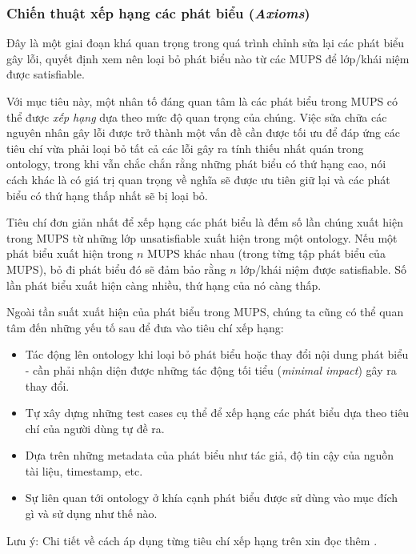 		\subsubsection{Chiến thuật xếp hạng các phát biểu (\textit{Axioms})}
		Đây là một giai đoạn khá quan trọng trong quá trình chỉnh sửa lại các phát biểu gây lỗi, quyết định xem nên loại bỏ phát biểu nào từ các MUPS để lớp/khái niệm được satisfiable.
		
		\hspace*{.05\textwidth} Với mục tiêu này, một nhân tố đáng quan tâm là các phát biểu trong MUPS có thể được \textit{xếp hạng} dựa theo mức độ quan trọng của chúng. Việc sửa chữa các nguyên nhân gây lỗi được trở thành một vấn đề cần được tối ưu để đáp ứng các tiêu chí vừa phải loại bỏ tất cả các lỗi gây ra tính thiếu nhất quán trong ontology, trong khi vẫn chắc chắn rằng những phát biểu có thứ hạng cao, nói cách khác là có giá trị quan trọng về nghĩa sẽ được ưu tiên giữ lại và các phát biểu có thứ hạng thấp nhất sẽ bị loại bỏ.
		
		\hspace*{.05\textwidth} Tiêu chí đơn giản nhất để xếp hạng các phát biểu là đếm số lần chúng xuất hiện trong MUPS từ những lớp unsatisfiable xuất hiện trong một ontology. Nếu một phát biểu xuất hiện trong $n$ MUPS khác nhau (trong từng tập phát biểu của MUPS), bỏ đi phát biểu đó sẽ đảm bảo rằng $n$ lớp/khái niệm được satisfiable. Số lần phát biểu xuất hiện càng nhiều, thứ hạng của nó càng thấp.
		
		\hspace*{0.05\textwidth} Ngoài tần suất xuất hiện của phát biểu trong MUPS, chúng ta cũng có thể quan tâm đến những yếu tố sau để đưa vào tiêu chí xếp hạng:
		\begin{itemize}
			\item Tác động lên ontology khi loại bỏ phát biểu hoặc thay đổi nội dung phát biểu - cần phải nhận diện được những tác động tối tiểu (\textit{minimal impact})  gây ra thay đổi.
			\item Tự xây dựng những test cases cụ thể để xếp hạng các phát biểu dựa theo tiêu chí của người dùng tự đề ra.
			\item Dựa trên những metadata của phát biểu như tác giả, độ tin cậy của nguồn tài liệu, timestamp, etc.
			\item Sự liên quan tới ontology ở khía cạnh phát biểu được sử dùng vào mục đích gì và sử dụng như thế nào.
		\end{itemize}
		Lưu ý: Chi tiết về cách áp dụng từng tiêu chí xếp hạng trên xin đọc thêm \cite{repair}.
